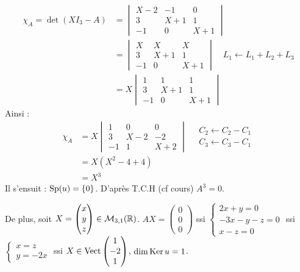 \begin{solution}
\begin{align*}
\chi_A = \det(X I_3 - A) &=
\begin{vmatrix} X-2 & -1 & 0 \\ 3 & X+1 & 1 \\ -1 & 0 & X+1 \end{vmatrix} \\
&= \begin{vmatrix} X & X & X \\ 3 & X+1 & 1 \\ -1 & 0 & X+1 \end{vmatrix} \quad L_1 \leftarrow L_1 + L_2 + L_3 \\
&= X \begin{vmatrix} 1 & 1 & 1 \\ 3 & X+1 & 1 \\ -1 & 0 & X+1 \end{vmatrix}
\end{align*}
Ainsi :
\begin{align*}
\chi_A &= X \begin{vmatrix} 1 & 0 & 0 \\ 3 & X-2 & -2 \\ -1 & 1 & X+2 \end{vmatrix} \quad \begin{matrix} C_2 \leftarrow C_2 - C_1 \\ C_3 \leftarrow C_3 - C_1 \end{matrix} \\
&= X (X^2 - 4 + 4) \\
&= X^3
\end{align*}
Il s'ensuit :
$\operatorname{Sp}(u) = \{0\}$.
D'après T.C.H (cf cours) $A^3 = 0$.

De plus, soit $X = \begin{pmatrix} x \\ y \\ z \end{pmatrix} \in \mathcal M_{3,1}(\mathbb R)$.
$AX = \begin{pmatrix} 0 \\ 0 \\ 0 \end{pmatrix}$ ssi $\begin{cases} 2x + y = 0 \\ -3x - y - z = 0 \\ x - z = 0 \end{cases}$
ssi $\begin{cases} x = z \\ y = -2x \end{cases}$
ssi $X \in \operatorname{Vect} \begin{pmatrix} 1 \\ -2 \\ 1 \end{pmatrix}$, $\dim \operatorname{Ker} u = 1$.


\end{solution}
